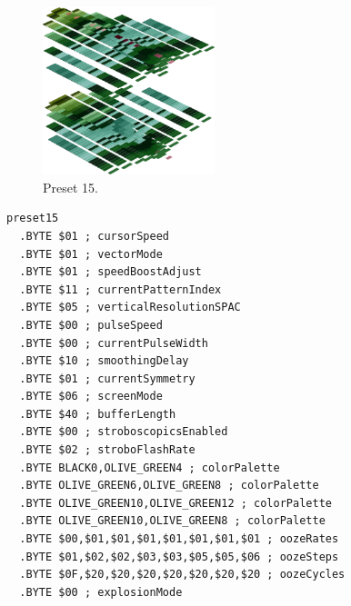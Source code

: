 \clearpage
\begin{minipage}[b]{0.48\linewidth}
\begin{figure}[H]                                                          
  \centering                                                             
  \begin{adjustbox}{width=5cm,center}                                   
  \includegraphics[width=5cm]{src/colorspace_presets/preset15-45.png}%
  \end{adjustbox}                                                        
\caption*{Preset 15.}                                           
\end{figure}                                                               
\end{minipage}
\hspace{0.1cm}
\begin{minipage}[b]{0.48\linewidth}                            
\begin{lstlisting}[basicstyle=\ttfamily\tiny]
preset15
  .BYTE $01 ; cursorSpeed
  .BYTE $01 ; vectorMode
  .BYTE $01 ; speedBoostAdjust
  .BYTE $11 ; currentPatternIndex
  .BYTE $05 ; verticalResolutionSPAC
  .BYTE $00 ; pulseSpeed
  .BYTE $00 ; currentPulseWidth
  .BYTE $10 ; smoothingDelay
  .BYTE $01 ; currentSymmetry
  .BYTE $06 ; screenMode
  .BYTE $40 ; bufferLength
  .BYTE $00 ; stroboscopicsEnabled
  .BYTE $02 ; stroboFlashRate
  .BYTE BLACK0,OLIVE_GREEN4 ; colorPalette
  .BYTE OLIVE_GREEN6,OLIVE_GREEN8 ; colorPalette
  .BYTE OLIVE_GREEN10,OLIVE_GREEN12 ; colorPalette
  .BYTE OLIVE_GREEN10,OLIVE_GREEN8 ; colorPalette
  .BYTE $00,$01,$01,$01,$01,$01,$01,$01 ; oozeRates
  .BYTE $01,$02,$02,$03,$03,$05,$05,$06 ; oozeSteps
  .BYTE $0F,$20,$20,$20,$20,$20,$20,$20 ; oozeCycles
  .BYTE $00 ; explosionMode
\end{lstlisting}
\end{minipage}

\vspace*{-0.5cm}

